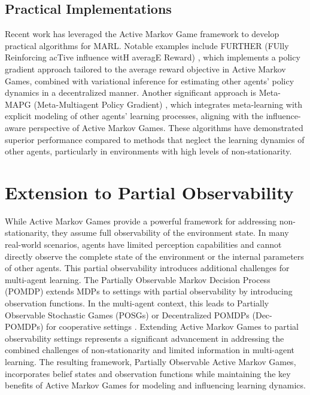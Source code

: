 \documentclass[a4paper,12pt]{report}
\begin{document}
\subsection{Practical Implementations}

Recent work has leveraged the Active Markov Game framework to develop practical algorithms for MARL. Notable examples include FURTHER (FUlly Reinforcing acTive influence witH averagE Reward) \cite{kim2022influencing}, which implements a policy gradient approach tailored to the average reward objective in Active Markov Games, combined with variational inference for estimating other agents' policy dynamics in a decentralized manner. Another significant approach is Meta-MAPG (Meta-Multiagent Policy Gradient) \cite{kim2021policy}, which integrates meta-learning with explicit modeling of other agents' learning processes, aligning with the influence-aware perspective of Active Markov Games. These algorithms have demonstrated superior performance compared to methods that neglect the learning dynamics of other agents, particularly in environments with high levels of non-stationarity.

\section{Extension to Partial Observability}

While Active Markov Games provide a powerful framework for addressing non-stationarity, they assume full observability of the environment state. In many real-world scenarios, agents have limited perception capabilities and cannot directly observe the complete state of the environment or the internal parameters of other agents. This partial observability introduces additional challenges for multi-agent learning. The Partially Observable Markov Decision Process (POMDP) \cite{kaelbling1998planning} extends MDPs to settings with partial observability by introducing observation functions. In the multi-agent context, this leads to Partially Observable Stochastic Games (POSGs) \cite{hansen2004dynamic} or Decentralized POMDPs (Dec-POMDPs) for cooperative settings \cite{bernstein2002complexity}. Extending Active Markov Games to partial observability settings represents a significant advancement in addressing the combined challenges of non-stationarity and limited information in multi-agent learning. The resulting framework, Partially Observable Active Markov Games, incorporates belief states and observation functions while maintaining the key benefits of Active Markov Games for modeling and influencing learning dynamics.
\end{document}
